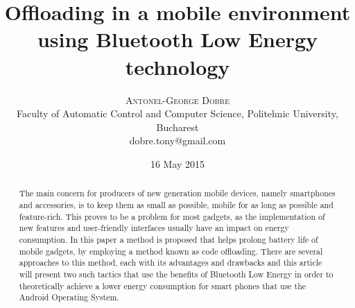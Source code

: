 \documentclass[twoside]{article}
\title{\vspace{-15mm}%
	\fontsize{24pt}{10pt}\selectfont
	\textbf{Offloading in a mobile environment using Bluetooth Low Energy technology}
	}
\author{%
	\large
	\textsc{Antonel-George Dobre} \\[2mm]
	\normalsize	Faculty of Automatic Control and Computer Science, Politehnic University, Bucharest \\
	\normalsize{dobre.tony@gmail.com}\\[2mm]
	\vspace{-5mm}
	}
\date{16 May 2015}
\begin{document}
\maketitle
\thispagestyle{fancy}

\begin{abstract}
\noindent  The main concern for producers of new generation mobile devices, namely smartphones and accessories, is to keep them as small as possible, mobile for as long as possible and feature-rich. This proves to be a problem for most gadgets, as the implementation of new features and user-friendly interfaces usually have an impact on energy consumption. In this paper a method is proposed that helps prolong battery life of mobile gadgets, by employing a method known as code offloading. There are several approaches to this method, each with its advantages and drawbacks and this article will present two such tactics that use the benefits of Bluetooth Low Energy in order to theoretically achieve a lower energy consumption for smart phones that use the Android Operating System.

\end{abstract}
	
\end{document}
